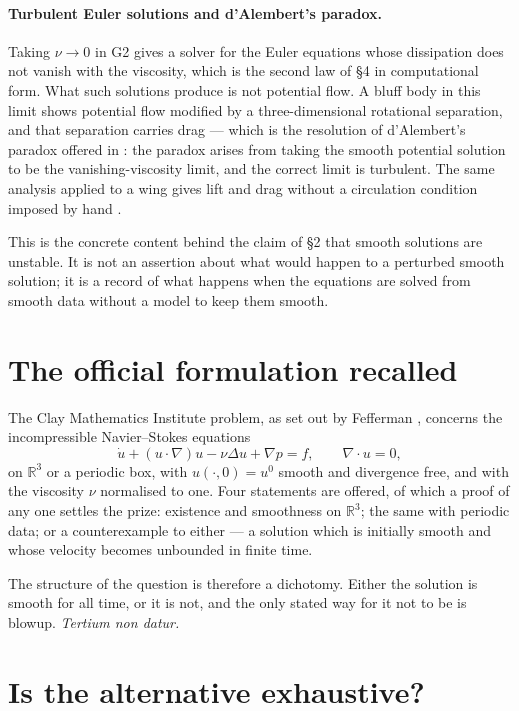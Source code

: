 \documentclass[11pt]{article}
\newcommand{\grad}{\nabla}
\begin{document}
\paragraph{Turbulent Euler solutions and d'Alembert's paradox.} Taking $\nu\to0$ in G2 gives a
solver for the Euler equations whose dissipation does not vanish with the viscosity, which is the
second law of \S4 in computational form. What such solutions produce is not potential flow. A bluff
body in this limit shows potential flow modified by a three-dimensional rotational separation, and
that separation carries drag --- which is the resolution of d'Alembert's paradox offered in
\cite{dalembert}: the paradox arises from taking the smooth potential solution to be the
vanishing-viscosity limit, and the correct limit is turbulent. The same analysis applied to a wing
gives lift and drag without a circulation condition imposed by hand \cite{flight}.

This is the concrete content behind the claim of \S2 that smooth solutions are unstable. It is not
an assertion about what would happen to a perturbed smooth solution; it is a record of what happens
when the equations are solved from smooth data without a model to keep them smooth.

\section{The official formulation recalled}\label{sec:official}

The Clay Mathematics Institute problem, as set out by Fefferman \cite{fefferman}, concerns the
incompressible Navier--Stokes equations
\begin{equation}\label{eq:ns}
\dot u + (u\cdot\grad)u - \nu\Delta u + \grad p = f,\qquad \grad\cdot u = 0,
\end{equation}
on $\mathbb{R}^3$ or a periodic box, with $u(\cdot,0)=u^0$ smooth and divergence free, and with the
viscosity $\nu$ normalised to one. Four statements are offered, of which a proof of any one settles
the prize: existence and smoothness on $\mathbb{R}^3$; the same with periodic data; or a
counterexample to either --- a solution which is initially smooth and whose velocity becomes
unbounded in finite time.

The structure of the question is therefore a dichotomy. Either the solution is smooth for all time,
or it is not, and the only stated way for it not to be is blowup. \emph{Tertium non datur.}

\section{Is the alternative exhaustive?}
\end{document}
